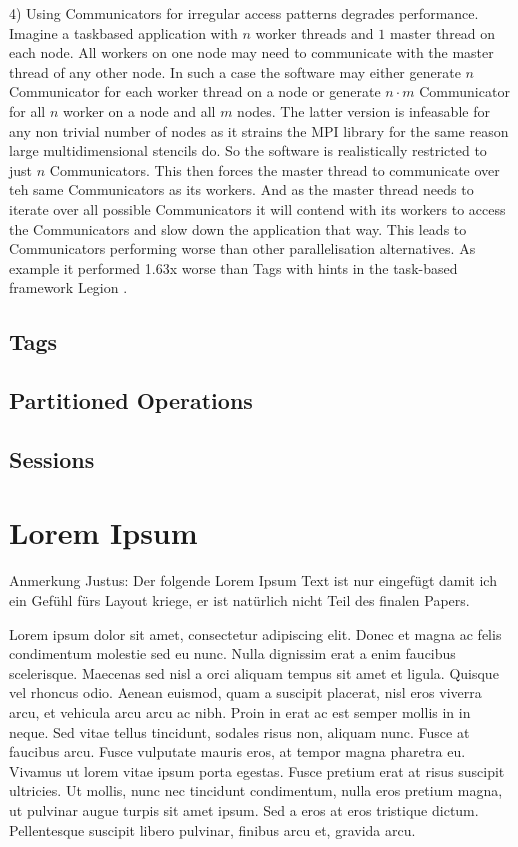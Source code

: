 \documentclass[sigconf]{acmart}
\begin{document}
4) Using Communicators for irregular access patterns degrades performance.
Imagine a taskbased application with $n$ worker threads and $1$ master thread on each node.
All workers on one node may need to communicate with the master thread of any other node.
In such a case the software may either generate $n$ Communicator for each worker thread on a node or generate $n \cdot m$ Communicator for all $n$ worker on a node and all $m$ nodes.
The latter version is infeasable for any non trivial number of nodes as it strains the MPI library for the same reason large multidimensional stencils do.
So the software is realistically restricted to just $n$ Communicators.
This then forces the master thread to communicate over teh same Communicators as its workers.
And as the master thread needs to iterate over all possible Communicators it will contend with its workers to access the Communicators and slow down the application that way.
This leads to Communicators performing worse than other parallelisation alternatives.
As example it performed 1.63x worse than Tags with hints in the task-based framework Legion \cite{zambreLogicalParallel2021}.

\subsection{Tags}
\subsection{Partitioned Operations}
\subsection{Sessions}

\section{Lorem Ipsum}

Anmerkung Justus: Der folgende Lorem Ipsum Text ist nur eingefügt damit ich ein Gefühl fürs Layout kriege, er ist natürlich nicht Teil des finalen Papers.

Lorem ipsum dolor sit amet, consectetur adipiscing elit. Donec et magna ac felis condimentum molestie sed eu nunc. Nulla dignissim erat a enim faucibus scelerisque. Maecenas sed nisl a orci aliquam tempus sit amet et ligula. Quisque vel rhoncus odio. Aenean euismod, quam a suscipit placerat, nisl eros viverra arcu, et vehicula arcu arcu ac nibh. Proin in erat ac est semper mollis in in neque. Sed vitae tellus tincidunt, sodales risus non, aliquam nunc. Fusce at faucibus arcu. Fusce vulputate mauris eros, at tempor magna pharetra eu. Vivamus ut lorem vitae ipsum porta egestas. Fusce pretium erat at risus suscipit ultricies. Ut mollis, nunc nec tincidunt condimentum, nulla eros pretium magna, ut pulvinar augue turpis sit amet ipsum. Sed a eros at eros tristique dictum. Pellentesque suscipit libero pulvinar, finibus arcu et, gravida arcu.
\end{document}
